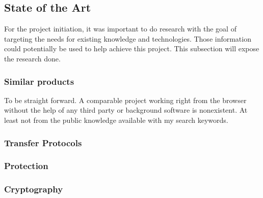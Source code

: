 
\subsection{State of the Art}
For the project initiation, it was important to do research with the goal of targeting the needs for existing knowledge and technologies. Those information could potentially be used to help achieve this project. This subsection will expose the research done.

\subsubsection{Similar products}
To be straight forward. A comparable project working right from the browser without the help of any third party or background software is nonexistent. At least not from the public knowledge available with my search keywords.



\subsubsection{Transfer Protocols}

\subsubsection{Protection}

\subsubsection{Cryptography}

